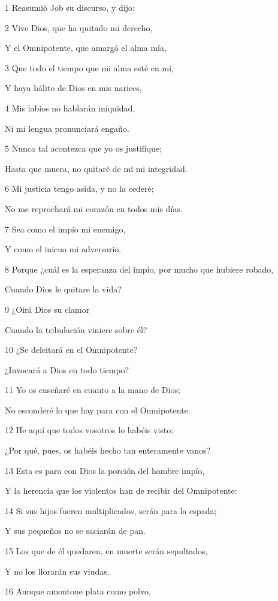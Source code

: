 \par 1 Reasumió Job su discurso, y dijo:
\par 2 Vive Dios, que ha quitado mi derecho,
\par Y el Omnipotente, que amargó el alma mía,
\par 3 Que todo el tiempo que mi alma esté en mí,
\par Y haya hálito de Dios en mis narices,
\par 4 Mis labios no hablarán iniquidad,
\par Ni mi lengua pronunciará engaño.
\par 5 Nunca tal acontezca que yo os justifique;
\par Hasta que muera, no quitaré de mí mi integridad.
\par 6 Mi justicia tengo asida, y no la cederé;
\par No me reprochará mi corazón en todos mis días.
\par 7 Sea como el impío mi enemigo,
\par Y como el inicuo mi adversario.
\par 8 Porque ¿cuál es la esperanza del impío, por mucho que hubiere robado,
\par Cuando Dios le quitare la vida?
\par 9 ¿Oirá Dios su clamor
\par Cuando la tribulación viniere sobre él?
\par 10 ¿Se deleitará en el Omnipotente?
\par ¿Invocará a Dios en todo tiempo?
\par 11 Yo os enseñaré en cuanto a la mano de Dios;
\par No esconderé lo que hay para con el Omnipotente.
\par 12 He aquí que todos vosotros lo habéis visto;
\par ¿Por qué, pues, os habéis hecho tan enteramente vanos?
\par 13 Esta es para con Dios la porción del hombre impío,
\par Y la herencia que los violentos han de recibir del Omnipotente:
\par 14 Si sus hijos fueren multiplicados, serán para la espada;
\par Y sus pequeños no se saciarán de pan.
\par 15 Los que de él quedaren, en muerte serán sepultados,
\par Y no los llorarán sus viudas.
\par 16 Aunque amontone plata como polvo,
